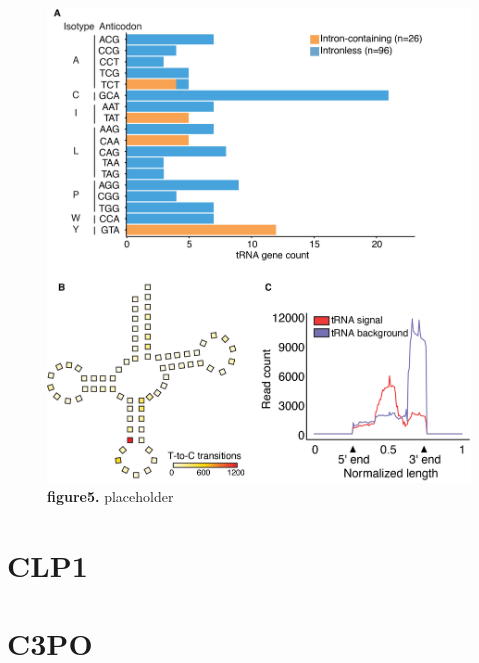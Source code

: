 \documentclass[12pt]{rockefeller}
\begin{document}
\begin{figure}[!ht]%
\centering
\includegraphics[width=\textwidth]{paper5.png}%
\caption[figure5]
{\textbf{figure5.}
placeholder}
\centering
\label{paper5}%
\end{figure}

\chapter{CLP1}
\chapter{C3PO}

\renewcommand{\bibname}{References}
%
\printbibliography
{} %
\end{document}

